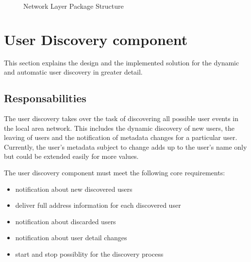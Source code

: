 \begin{figure}[H]
 \centering
 \caption{Network Layer Package Structure}
 \label{fig:network.architecture.package}
\end{figure}


\section{User Discovery component}
This section explains the design and the implemented solution for the dynamic and automatic user discovery in greater detail.

\subsection{Responsabilities}
The user discovery takes over the task of discovering all possible user events in the local area network. This includes the dynamic discovery of new users, the leaving of users and the notification of metadata changes for a particular user. Currently, the user's metadata subject to change adds up to the user's name only but could be extended easily for more values.

The user discovery component must meet the following core requirements:

\begin{itemize}
 \item notification about new discovered users
 \item deliver full address information for each discovered user
 \item notification about discarded users
 \item notification about user detail changes
 \item start and stop possiblity for the discovery process 
\end{itemize}

